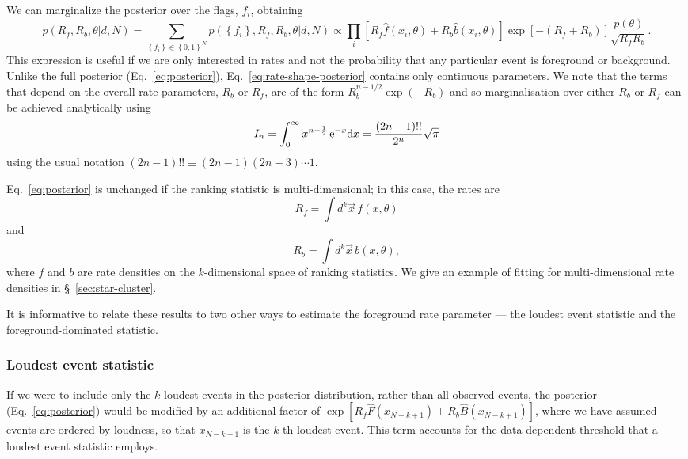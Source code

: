 \documentclass[aps,prd]{revtex4-1}
\newcommand{\mathset}[1]{\left\{ #1 \right\}}
\begin{document}
We can marginalize the posterior over the flags, $f_i$, obtaining
\begin{equation}
  \label{eq:rate-shape-posterior}
  p\left( R_f, R_b, \theta | d, N \right) = \sum_{\mathset{f_i} \in
    \mathset{0,1}^N} p\left( \mathset{f_i}, R_f, R_b, \theta | d, N
  \right) \propto \prod_{i} \left[ R_f \hat{f}\left(x_i, \theta\right)
    + R_b \hat{b}\left( x_i, \theta\right) \right] \exp\left[-\left(
    R_f + R_b \right) \right] \frac{p(\theta)}{\sqrt{R_f R_b}}.
\end{equation}
This expression is useful if we are only interested in rates and not
the probability that any particular event is foreground or background.
Unlike the full posterior (Eq.~\eqref{eq:posterior}),
Eq.~\eqref{eq:rate-shape-posterior} contains only continuous
parameters. We note that the terms that depend on the overall rate
parameters, $R_b$ or $R_f$, are of the form $R_b^{n-1/2} \exp(-R_b)$
and so marginalisation over either $R_b$ or $R_f$ can be achieved
analytically using
\begin{equation}
I_n = \int_0^{\infty} x^{n-\frac{1}{2}} \, {\rm e}^{-x} {\rm d} x =
\frac{(2n-1)!!}{2^n} \sqrt{\pi}
\end{equation}
using the usual notation $(2n-1)!! \equiv (2n-1)(2n-3)\cdots1$.

Eq.~\eqref{eq:posterior} is unchanged if the ranking statistic is
multi-dimensional; in this case, the rates are
\begin{equation}
  R_f = \int d^k \vec{x} \, f(x, \theta)
\end{equation}
and
\begin{equation}
  R_b = \int d^k \vec{x} \, b(x, \theta),
\end{equation}
where $f$ and $b$ are rate densities on the $k$-dimensional space of
ranking statistics.  We give an example of fitting for
multi-dimensional rate densities in \S~\ref{sec:star-cluster}.

It is informative to relate these results to two other ways to
estimate the foreground rate parameter --- the loudest event statistic
and the foreground-dominated statistic.

\subsubsection{Loudest event statistic}
If we were to include only the $k$-loudest events in the posterior
distribution, rather than all observed events, the posterior
(Eq.~\eqref{eq:posterior}) would be modified by an additional factor
of $\exp[R_f \hat{F}(x_{N-k+1}) + R_b \hat{B}(x_{N-k+1})]$, where we
have assumed events are ordered by loudness, so that $x_{N-k+1}$ is
the $k$-th loudest event. This term accounts for the data-dependent
threshold that a loudest event statistic employs.
\end{document}
